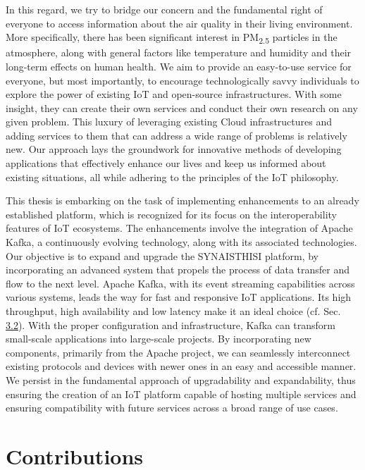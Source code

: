 In this regard, we try to bridge our concern and the fundamental right of everyone to access information about the air quality in their living environment. More specifically, there has been significant interest in PM\textsubscript{2.5} particles in the atmosphere, along with general factors like temperature and humidity and their long-term effects on human health\cite{effectofheatandairpollution,RecentInsightsParticulateMatter}. We aim to provide an easy-to-use service for everyone, but most importantly, to encourage technologically savvy individuals to explore the power of existing IoT and open-source infrastructures. With some insight, they can create their own services and conduct their own research on any given problem. This luxury of leveraging existing Cloud infrastructures\cite{ModernComputingParadigms} and adding services to them that can address a wide range of problems is relatively new. Our approach lays the groundwork for innovative methods of developing applications that effectively enhance our lives and keep us informed about existing situations, all while adhering to the principles of the IoT philosophy.

This thesis is embarking on the task of implementing enhancements to an already established platform, which is recognized for its focus on the interoperability features of IoT ecosystems. The enhancements involve the integration of Apache Kafka\cite{WhatIsApacheKafka}, a continuously evolving technology, along with its associated technologies. Our objective is to expand and upgrade the SYNAISTHISI platform, by incorporating an advanced system that propels the process of data transfer and flow to the next level. Apache Kafka, with its event streaming capabilities across various systems, leads the way for fast and responsive IoT applications. Its high throughput, high availability and low latency make it an ideal choice (cf. Sec. \hyperref[event_streaming]{3.2}). With the proper configuration and infrastructure, Kafka can transform small-scale applications into large-scale projects. By incorporating new components, primarily from the Apache project, we can seamlessly interconnect existing protocols and devices with newer ones in an easy and accessible manner. We persist in the fundamental approach of upgradability and expandability, thus ensuring the creation of an IoT platform capable of hosting multiple services and ensuring compatibility with future services across a broad range of use cases.

\clearpage
\section{Contributions}

